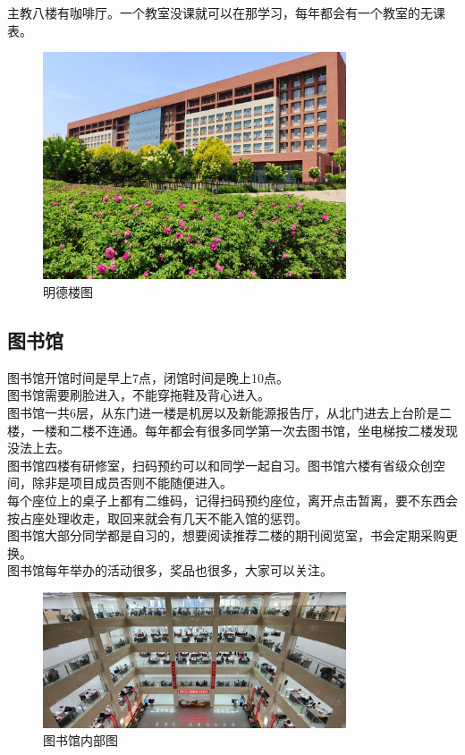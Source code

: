 \documentclass[12pt]{article} %
\begin{document}
	主教八楼有咖啡厅。一个教室没课就可以在那学习，每年都会有一个教室的无课表。\\
	
		\begin{figure}[!h]
		\centering
		\includegraphics[width=0.8\textwidth]{20240717163012.jpg}
		\caption{明德楼图} %
	\end{figure}
	
	\subsection{图书馆}
	图书馆开馆时间是早上7点，闭馆时间是晚上10点。\\
	
	图书馆需要刷脸进入，不能穿拖鞋及背心进入。\\
	
	图书馆一共6层，从东门进一楼是机房以及新能源报告厅，从北门进去上台阶是二楼，一楼和二楼不连通。每年都会有很多同学第一次去图书馆，坐电梯按二楼发现没法上去。\\
	
	图书馆四楼有研修室，扫码预约可以和同学一起自习。图书馆六楼有省级众创空间，除非是项目成员否则不能随便进入。\\
	
	每个座位上的桌子上都有二维码，记得扫码预约座位，离开点击暂离，要不东西会按占座处理收走，取回来就会有几天不能入馆的惩罚。\\
	
	图书馆大部分同学都是自习的，想要阅读推荐二楼的期刊阅览室，书会定期采购更换。\\
	
	图书馆每年举办的活动很多，奖品也很多，大家可以关注。\\
	
	\begin{figure}[!h]
		\centering
		\includegraphics[width=0.8\textwidth]{202444.jpg}
		\caption{图书馆内部图} %
	\end{figure}
	
\end{document}
